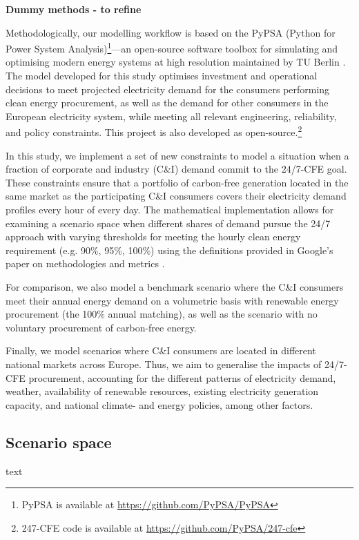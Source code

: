 \textbf{Dummy methods - to refine}

Methodologically, our modelling workflow is based on the PyPSA (Python for Power System Analysis)\footnote{PyPSA is available at \url{https://github.com/PyPSA/PyPSA}}—an open-source software toolbox for simulating and optimising modern energy systems at high resolution maintained by TU Berlin \cite{Brown-PyPSA,HORSCH-PyPSAEUR}. 
The model developed for this study optimises investment and operational decisions to meet projected electricity demand for the consumers performing clean energy procurement, as well as the demand for other consumers in the European electricity system, while meeting all relevant engineering, reliability, and policy constraints. 
This project is also developed as open-source.\footnote{247-CFE code is available at  \url{https://github.com/PyPSA/247-cfe}}

In this study, we implement a set of new constraints to model a situation when a fraction of corporate and industry (C\&I) demand commit to the 24/7-CFE goal. 
These constraints ensure that a portfolio of carbon-free generation located in the same market as the participating C\&I consumers covers their electricity demand profiles every hour of every day. 
The mathematical implementation allows for examining a scenario space when different shares of demand pursue the 24/7 approach with varying thresholds for meeting the hourly clean energy requirement (e.g. 90\%, 95\%, 100\%) using the definitions provided in Google's paper on methodologies and metrics \cite{Google-methods}.

For comparison, we also model a benchmark scenario where the C\&I consumers meet their annual energy demand on a volumetric basis with renewable energy procurement (the 100\% annual matching), as well as the scenario with no voluntary procurement of carbon-free energy.

Finally, we model scenarios where C\&I consumers are located in different national markets across Europe. 
Thus, we aim to generalise the impacts of 24/7-CFE procurement, accounting for the different patterns of electricity demand, weather, availability of renewable resources, existing electricity generation capacity, and national climate- and energy policies, among other factors.

\subsection{Scenario space}
\label{subsec:scenarios}
text